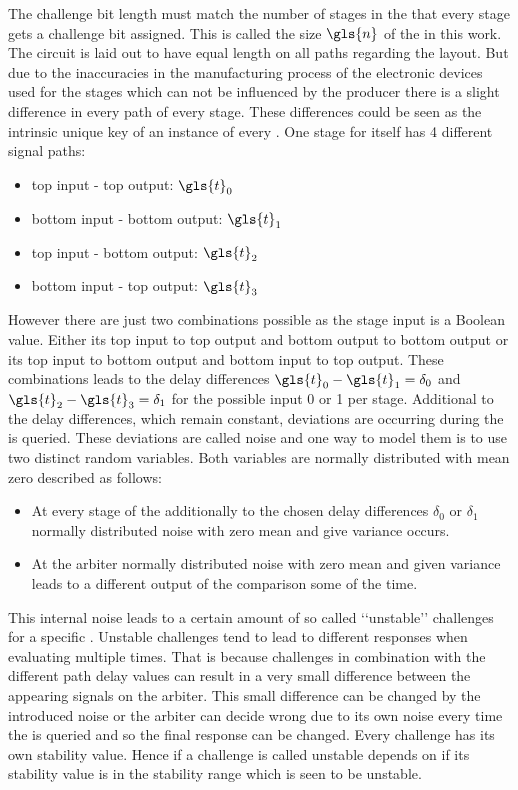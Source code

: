 The challenge bit length must match the number of stages in the \apuf that every stage gets a challenge bit assigned. 
This is called the size $\gls{n}$ of the \apuf in this work.
The circuit is laid out to have equal length on all paths regarding the layout.
But due to the inaccuracies in the manufacturing process of the electronic devices used for the stages which can not be influenced by the producer there is a slight difference in every path of every stage.
These differences could be seen as the intrinsic unique key of an instance of every \apuf.
One stage for itself has 4 different signal paths: 

\begin{itemize}
\item top input - top output: $\gls{t}_0$
\item bottom input - bottom output: $\gls{t}_1$
\item top input - bottom output: $\gls{t}_2$
\item bottom input - top output: $\gls{t}_3$
\end{itemize}

However there are just two combinations possible as the stage input is a Boolean value.
Either its top input to top output and bottom output to bottom output or its top input to bottom output and bottom input to top output.
These combinations leads to the delay differences $\gls{t}_0 - \gls{t}_1 = \delta_0$ and $\gls{t}_2 - \gls{t}_3 = \delta_1$ for the possible input 0 or 1 per stage.
Additional to the delay differences, which remain constant, deviations are occurring during the \apuf is queried.
These deviations are called noise and one way to model them is to use two distinct random variables.
Both variables are normally distributed with mean zero described as follows:

\begin{itemize}
\item At every stage of the \apuf additionally to the chosen delay differences $\delta_0$ or $\delta_1$ normally distributed noise with zero mean and give variance occurs.
\item At the arbiter normally distributed noise with zero mean and given variance leads to a different output of the comparison some of the time.
\end{itemize}

This internal noise leads to a certain amount of so called ‘‘unstable’’ challenges for a specific \apuf. 
Unstable challenges tend to lead to different responses when evaluating multiple times.
That is because challenges in combination with the different path delay values can result in a very small difference between the appearing signals on the arbiter.
This small difference can be changed by the introduced noise or the arbiter can decide wrong due to its own noise every time the \apuf is queried and so the final response can be changed.
Every challenge has its own stability value.
Hence if a challenge is called unstable depends on if its stability value is in the stability range which is seen to be unstable.

